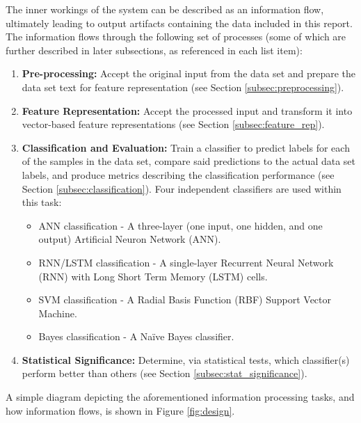 \documentclass[conference]{sig-alternate-05-2015}
\begin{document}
The inner workings of the system can be described as an information flow,
ultimately leading to output artifacts containing the data included in this
report. The information flows through the following set of processes (some of
which are further described in later subsections, as referenced in each list
item):
\begin{enumerate}
  \item \textbf{Pre-processing:} Accept the original input from the data set and
  prepare the data set text for feature representation (see Section
  \ref{subsec:preprocessing}).
  \item \textbf{Feature Representation:} Accept the processed input and
  transform it into vector-based feature representations (see Section
  \ref{subsec:feature_rep}).
  \item \textbf{Classification and Evaluation:} Train a classifier to predict
  labels for each of the samples in the data set, compare said predictions to
  the actual data set labels, and produce metrics describing the classification
  performance (see Section \ref{subsec:classification}). Four independent
  classifiers are used within this task:
  \begin{itemize}
    \item ANN classification - A three-layer (one input, one hidden, and
    one output) Artificial Neuron Network (ANN).
    \item RNN/LSTM classification - A single-layer Recurrent Neural
    Network (RNN) with Long Short Term Memory (LSTM) cells.
    \item SVM classification - A Radial Basis Function (RBF) Support Vector
    Machine.
    \item Bayes classification - A Na\"{i}ve Bayes classifier.
  \end{itemize}
  \item \textbf{Statistical Significance:} Determine, via statistical tests,
  which classifier(s) perform better than others (see Section
  \ref{subsec:stat_significance}).
\end{enumerate}

A simple diagram depicting the aforementioned information processing tasks, and
how information flows, is shown in Figure \ref{fig:design}.
\end{document}
